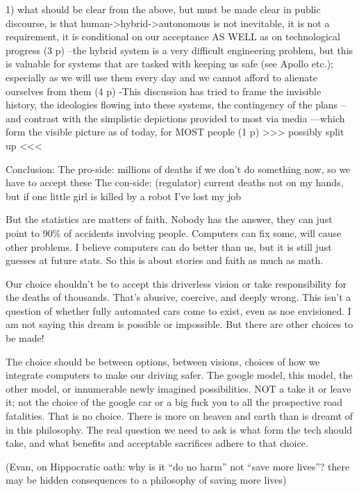 1) what should be clear from the above, but must be made clear in
public discourse, is that human->hybrid->autonomous is not inevitable,
it is not a requirement, it is conditional on our acceptance AS WELL
as on technological progress (3 p)
--the hybrid system is a very difficult engineering problem, but this
is valuable for systems that are tasked with keeping us safe (see
Apollo etc.); especially as we will use them every day and we cannot
afford to alienate ourselves from them (4 p)
-This discussion has tried to frame the invisible history, the
ideologies flowing into these systems, the contingency of the plans
--and contrast with the simplistic depictions provided to most via
media
---which form the visible picture as of today, for MOST people (1 p)
>>> possibly split up <<<




Conclusion:
The pro-side: millions of deaths if we don't do something now, so we
have to accept these
The con-side: (regulator) current deaths not on my hands, but if one
little girl is killed by a robot I've lost my job

But the statistics are matters of faith. Nobody has the answer, they
can just point to 90\% of accidents involving people. Computers can fix
                     some, will cause other problems. I believe
                     computers can do better than us, but it is still
                     just guesses at future stats. So this is about
                     stories and faith as much as math.

Our choice shouldn't be to accept this driverless vision or take
responsibility for the deaths of thousands. That's abusive, coercive,
and deeply wrong. This isn't a question of whether fully automated
cars come to exist, even as noe envisioned. I am not saying this dream
is possible or impossible. But there are other choices to be made!

The choice should be between options, between visions, choices of how
we integrate computers to make our driving safer. The google model,
this model, the other model, or innumerable newly imagined
possibilities. NOT a take it or leave it; not the choice of the google
car or a big fuck you to all the prospective road fatalities. That is
no choice. There is more on heaven and earth than is dreamt of in this
philosophy. The real question we need to ask is what form the tech
should take, and what benefits and acceptable sacrifices adhere to
that choice.

(Evan, on Hippocratic oath: why is it ``do no harm'' not ``save more
lives''?
there may be hidden consequences to a philosophy of saving more lives)


